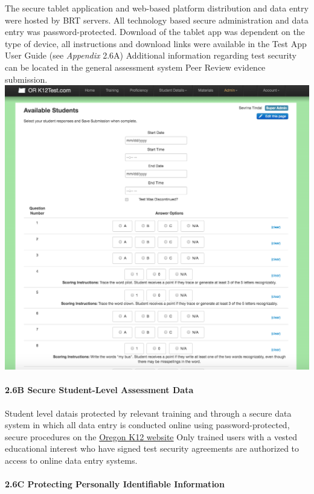 \documentclass[]{article}
\let\oldparagraph\paragraph
\renewcommand{\paragraph}[1]{\oldparagraph{#1}\mbox{}}
\begin{document}
The secure tablet application and web-based platform distribution and
data entry were hosted by BRT servers. All technology based secure
administration and data entry was password-protected. Download of the
tablet app was dependent on the type of device, all instructions and
download links were available in the Test App User Guide (see
\emph{Appendix} 2.6A) Additional information regarding test security can
be located in the general assessment system Peer Review evidence
submission. \FloatBarrier
\includegraphics{Figures/TrainingSite/DataEntryPg.png}

\hypertarget{b-secure-student-level-assessment-data}{%
\paragraph{2.6B Secure Student-Level Assessment
Data}\label{b-secure-student-level-assessment-data}}

Student level datais protected by relevant training and through a secure
data system in which all data entry is conducted online using
password-protected, secure procedures on the \color{link}
\href{https://or.k12test.com}{Oregon K12 website} \color{black} Only
trained users with a vested educational interest who have signed test
security agreements are authorized to access to online data entry
systems.

\hypertarget{c-protecting-personally-identifiable-information}{%
\paragraph{2.6C Protecting Personally Identifiable
Information}\label{c-protecting-personally-identifiable-information}}
\end{document}
